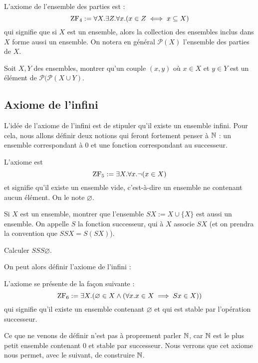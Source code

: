 \begin{ax}
    L'axiome de l'ensemble des parties est : $$\mathrm{ZF}_4 := \forall X.\exists Z. \forall x. (x\in Z \iff x\subseteq X)$$ qui signifie que si $X$ est un ensemble, alors la collection des ensembles inclus dans $X$ forme aussi un ensemble. On notera en général $\mathcal P(X)$ l'ensemble des parties de $X$.
\end{ax}

\begin{exo}
    Soit $X,Y$ des ensembles, montrer qu'un couple $(x,y)$ où $x\in X$ et $y\in Y$ est un élément de $\mathcal P (\mathcal P(X\cup Y)$.
\end{exo}

\subsection{Axiome de l'infini}

L'idée de l'axiome de l'infini est de stipuler qu'il existe un ensemble infini. Pour cela, nous allons définir deux notions qui feront fortement penser à $\mathbb{N}$ : un ensemble correspondant à $0$ et une \og fonction \fg{} correspondant au successeur.

\begin{ax}
    L'axiome est $$\mathrm{ZF}_5:=\exists X. \forall x. \lnot(x\in X)$$ et signifie qu'il existe un ensemble vide, c'est-à-dire un ensemble ne contenant aucun élément. On le note $\varnothing$.
\end{ax}

\begin{exo}
    Si $X$ est un ensemble, montrer que l'ensemble $SX := X \cup \{X\}$ est aussi un ensemble. On appelle $S$ la fonction successeur, qui à $X$ associe $SX$ (et on prendra la convention que $SSX = S(SX)$).

    Calculer $SSS\varnothing$.
\end{exo}

On peut alors définir l'axiome de l'infini :

\begin{ax}[Infini]
    L'axiome se présente de la façon suivante : $$\mathrm{ZF}_6 := \exists X.(\varnothing\in X \land (\forall x. x\in X \implies Sx\in X))$$ qui signifie qu'il existe un ensemble contenant $\varnothing$ et qui est stable par l'opération successeur.
\end{ax}

\begin{rmk}
    Ce que ne venons de définir n'est pas à proprement parler $\mathbb{N}$, car $\mathbb{N}$ est le plus petit ensemble contenant $0$ et stable par successeur. Nous verrons que cet axiome nous permet, avec le suivant, de construire $\mathbb{N}$.
\end{rmk}

